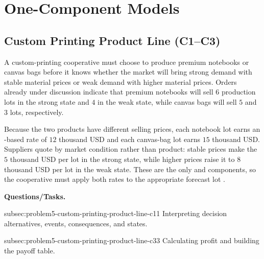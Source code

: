 	\section{One-Component Models}
	\label{sec:one-component-models}


	\subsection{Custom Printing Product Line (C1--C3)}
	\label{sec:problem5-custom-printing-product-line-c1-c3}

	A custom-printing cooperative must choose to produce premium notebooks or canvas bags before it knows whether the market will bring strong demand with stable material prices or weak demand with higher material prices. Orders already under discussion indicate that premium notebooks will sell \(6\) production lots in the strong state and \(4\) in the weak state, while canvas bags will sell \(5\) and \(3\) lots, respectively.

	Because the two products have different selling prices, each notebook lot earns an -based  rate of \(12\) thousand USD and each canvas-bag lot earns \(15\) thousand USD. Suppliers quote by market condition rather than product: stable prices make the  \(5\) thousand USD per lot in the strong state, while higher prices raise it to \(8\) thousand USD per lot in the weak state. These are the only  and  components, so the cooperative must apply both rates to the appropriate forecast lot .

	\textbf{Questions/Tasks.}
	\begin{enumerate}
		\CriterionTask
		{subsec:problem5-custom-printing-product-line-c1}{1}
		{Interpreting decision alternatives, events, consequences, and states.}

		\CriterionTask
		{subsec:problem5-custom-printing-product-line-c3}{3}
		{Calculating profit and building the payoff table.}
	\end{enumerate}

